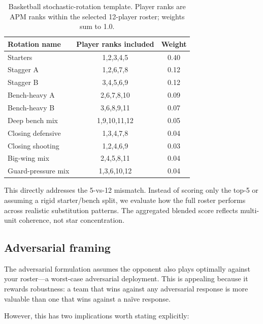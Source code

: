 \documentclass[12pt,letterpaper]{article}
\begin{document}
\begin{table}[h]
  \centering
  \caption{Basketball stochastic-rotation template. Player ranks are APM
    ranks within the selected 12-player roster; weights sum to 1.0.}
  \label{tab:rotation-template}
  \small
  \begin{tabular}{l c c}
    \toprule
    Rotation name & Player ranks included & Weight \\
    \midrule
    Starters          & 1,2,3,4,5    & 0.40 \\
    Stagger A         & 1,2,6,7,8    & 0.12 \\
    Stagger B         & 3,4,5,6,9    & 0.12 \\
    Bench-heavy A     & 2,6,7,8,10   & 0.09 \\
    Bench-heavy B     & 3,6,8,9,11   & 0.07 \\
    Deep bench mix    & 1,9,10,11,12 & 0.05 \\
    Closing defensive & 1,3,4,7,8    & 0.04 \\
    Closing shooting  & 1,2,4,6,9    & 0.03 \\
    Big-wing mix      & 2,4,5,8,11   & 0.04 \\
    Guard-pressure mix& 1,3,6,10,12  & 0.04 \\
    \bottomrule
  \end{tabular}
\end{table}

This directly addresses the 5-vs-12 mismatch.
Instead of scoring only the top-5 or assuming a rigid starter/bench
split, we evaluate how the full roster performs across realistic
substitution patterns.
The aggregated blended score reflects multi-unit coherence, not star
concentration.

\subsection{Adversarial framing}

The adversarial formulation assumes the opponent also plays optimally
against your roster---a worst-case adversarial deployment.
This is appealing because it rewards robustness: a team that wins
against any adversarial response is more valuable than one that wins
against a naïve response.

However, this has two implications worth stating explicitly:
\end{document}
